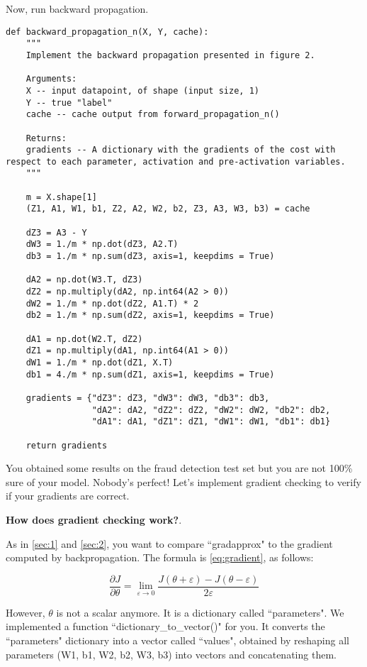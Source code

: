 Now, run backward propagation.

\begin{verbatim}
def backward_propagation_n(X, Y, cache):
    """
    Implement the backward propagation presented in figure 2.
    
    Arguments:
    X -- input datapoint, of shape (input size, 1)
    Y -- true "label"
    cache -- cache output from forward_propagation_n()
    
    Returns:
    gradients -- A dictionary with the gradients of the cost with respect to each parameter, activation and pre-activation variables.
    """
    
    m = X.shape[1]
    (Z1, A1, W1, b1, Z2, A2, W2, b2, Z3, A3, W3, b3) = cache
    
    dZ3 = A3 - Y
    dW3 = 1./m * np.dot(dZ3, A2.T)
    db3 = 1./m * np.sum(dZ3, axis=1, keepdims = True)
    
    dA2 = np.dot(W3.T, dZ3)
    dZ2 = np.multiply(dA2, np.int64(A2 > 0))
    dW2 = 1./m * np.dot(dZ2, A1.T) * 2
    db2 = 1./m * np.sum(dZ2, axis=1, keepdims = True)
    
    dA1 = np.dot(W2.T, dZ2)
    dZ1 = np.multiply(dA1, np.int64(A1 > 0))
    dW1 = 1./m * np.dot(dZ1, X.T)
    db1 = 4./m * np.sum(dZ1, axis=1, keepdims = True)
    
    gradients = {"dZ3": dZ3, "dW3": dW3, "db3": db3,
                 "dA2": dA2, "dZ2": dZ2, "dW2": dW2, "db2": db2,
                 "dA1": dA1, "dZ1": dZ1, "dW1": dW1, "db1": db1}
    
    return gradients
\end{verbatim} 

You obtained some results on the fraud detection test set but you are not 100\% sure of your model. Nobody's perfect! Let's implement gradient checking to verify if your gradients are correct.

{\textbf {How does gradient checking work?}}.

As in \ref{sec:1} and \ref{sec:2}, you want to compare ``gradapprox" to the gradient computed by backpropagation. The formula is \eqref{eq:gradient}, as follows:

\begin{equation*}
\frac{\partial J}{\partial \theta} = \lim_{\varepsilon \to 0} \frac{J(\theta + \varepsilon) - J(\theta - \varepsilon)}{2 \varepsilon} \end{equation*}

However, $\theta$ is not a scalar anymore. It is a dictionary called ``parameters". We implemented a function ``dictionary\_to\_vector()" for you. It converts the ``parameters" dictionary into a vector called ``values", obtained by reshaping all parameters (W1, b1, W2, b2, W3, b3) into vectors and concatenating them.

